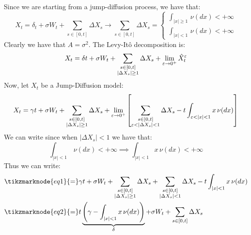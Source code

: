 \begin{example}
Since we are starting from a jump-diffusion process, we have that:
\[
    X_t = \delta_t + \sigma W_t + \sum_{s\in[0,t]} \Delta X_s \longrightarrow
   \sum_{s\in[0,t]} \Delta X_s = \left\{\begin{array}{l}\int_{|x|\geq1}\,\nu(dx)
    < +\infty \\ \int_{|x|<1} \, \nu(dx) < +\infty \end{array}\right.
\]
Clearly we have that $A = \sigma^2$. The Levy-Itô decomposition is:
\[
    X_t = \delta t + \sigma W_t + \sum_{\begin{subarray}{c}
        s\in[0,t] \\ |\Delta X_s| \geq 1
    \end{subarray}} \Delta X_s
    + \lim_{ \epsilon \to 0^+} \hat{X}^\epsilon_t
\]
Now, let $X_t$ be a Jump-Diffusion model:
\[ X_t = \gamma t + \sigma W_t + \sum_{\begin{subarray}{c}
    s\in[0,t]\\ |\Delta X_s| \geq 1\end{subarray}} \Delta
    X_s + \lim_{\epsilon \to 0^+} \left[ \sum_{\begin{subarray}{c}
        s\in[0,t]\\ \epsilon < |\Delta X_s| < 1
    \end{subarray}} \Delta X_s - t \int_{\epsilon < |x| < 1} x \, \nu(dx) \right]
\]
We can write since when $|\Delta X_s| < 1$ we have that:
\[ \int_{|x|<1} \,\nu(dx) < +\infty \implies \int_{|x|<1} x\,\nu(dx)<+\infty \]
Thus we can write:
\begin{align*}
    & \tikzmarknode{eq1}{=} \gamma t + \sigma W_t + \sum_{\begin{subarray}{c}
        s\in[0,t]\\ |\Delta X_s| \geq 1\end{subarray}}
        \Delta X_s + \sum_{\begin{subarray}{c} 
            s\in[0,t]\\ |\Delta X_s| < 1\end{subarray}} \Delta X_s
    - t \int_{|x|<1} x \,\nu(dx) \\
    & \tikzmarknode{eq2}{=} t \underbrace{\left( \gamma -\int_{|x|<1}x \,\nu(dx)
    \right)}_{\delta} + \sigma W_t + \sum_{s\in[0,t]} \Delta X_s
\end{align*} 
\end{example}

